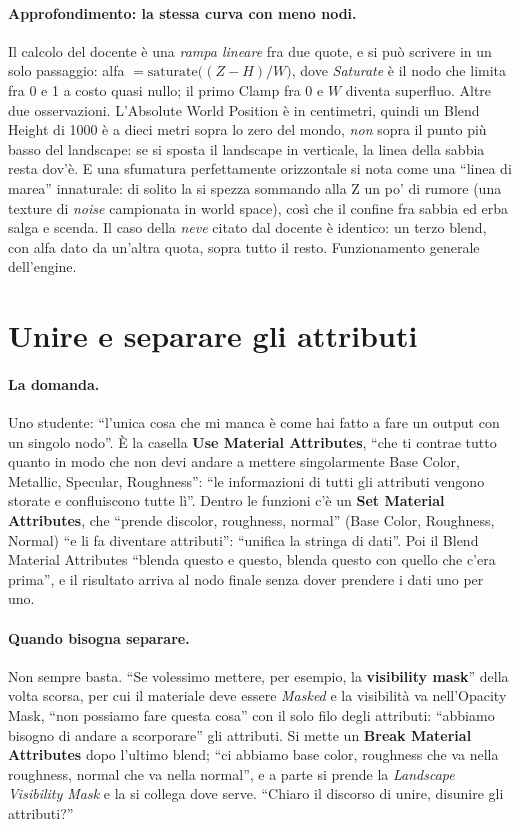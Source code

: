 \paragraph{Approfondimento: la stessa curva con meno nodi.} Il calcolo del docente è una
\emph{rampa lineare} fra due quote, e si può scrivere in un solo passaggio: alfa $=
\mathrm{saturate}\big((Z-H)/W\big)$, dove \emph{Saturate} è il nodo che limita fra 0 e 1 a
costo quasi nullo; il primo Clamp fra 0 e $W$ diventa superfluo. Altre due osservazioni.
L'Absolute World Position è in centimetri, quindi un Blend Height di 1000 è a dieci metri
sopra lo zero del mondo, \emph{non} sopra il punto più basso del landscape: se si sposta il
landscape in verticale, la linea della sabbia resta dov'è. E una sfumatura perfettamente
orizzontale si nota come una ``linea di marea'' innaturale: di solito la si spezza
sommando alla Z un po' di rumore (una texture di \emph{noise} campionata in world space),
così che il confine fra sabbia ed erba salga e scenda. Il caso della \emph{neve} citato dal
docente è identico: un terzo blend, con alfa dato da un'altra quota, sopra tutto il resto.
Funzionamento generale dell'engine.

\section{Unire e separare gli attributi}
\label{ue15:sec:attributi}

\paragraph{La domanda.} Uno studente: ``l'unica cosa che mi manca è come hai fatto a fare un
output con un singolo nodo''. È la casella \textbf{Use Material Attributes}, ``che ti
contrae tutto quanto in modo che non devi andare a mettere singolarmente Base Color,
Metallic, Specular, Roughness'': ``le informazioni di tutti gli attributi vengono storate e
confluiscono tutte lì''. Dentro le funzioni c'è un \textbf{Set Material Attributes}, che
``prende discolor, roughness, normal'' (Base Color, Roughness, Normal) ``e li fa diventare
attributi'': ``unifica la stringa di dati''. Poi il Blend Material Attributes ``blenda
questo e questo, blenda questo con quello che c'era prima'', e il risultato arriva al nodo
finale senza dover prendere i dati uno per uno.

\paragraph{Quando bisogna separare.} Non sempre basta. ``Se volessimo mettere, per esempio,
la \textbf{visibility mask}'' della volta scorsa, per cui il materiale deve essere
\emph{Masked} e la visibilità va nell'Opacity Mask, ``non possiamo fare questa cosa'' con il
solo filo degli attributi: ``abbiamo bisogno di andare a scorporare'' gli attributi. Si
mette un \textbf{Break Material Attributes} dopo l'ultimo blend; ``ci abbiamo base color,
roughness che va nella roughness, normal che va nella normal'', e a parte si prende la
\emph{Landscape Visibility Mask} e la si collega dove serve. ``Chiaro il discorso di unire,
disunire gli attributi?''

